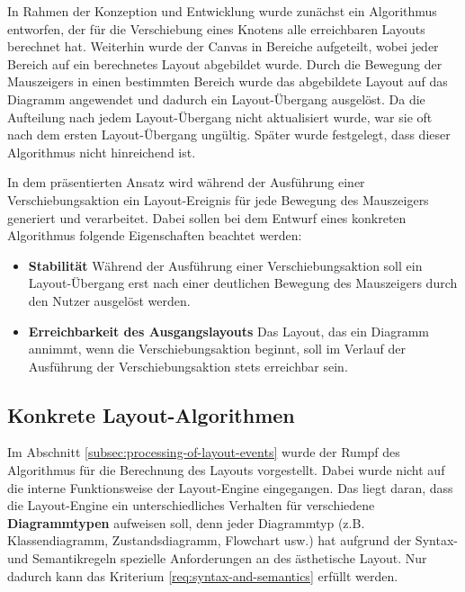 In Rahmen der Konzeption und Entwicklung wurde zunächst ein Algorithmus entworfen, der für die Verschiebung eines Knotens alle erreichbaren Layouts berechnet hat. Weiterhin wurde der Canvas in Bereiche aufgeteilt, wobei jeder Bereich auf ein berechnetes Layout abgebildet wurde. Durch die Bewegung der Mauszeigers in einen bestimmten Bereich wurde das abgebildete Layout auf das Diagramm angewendet und dadurch ein Layout-Übergang ausgelöst. Da die Aufteilung nach jedem Layout-Übergang nicht aktualisiert wurde, war sie oft nach dem ersten Layout-Übergang ungültig. Später wurde festgelegt, dass dieser Algorithmus nicht hinreichend ist.

In dem präsentierten Ansatz wird während der Ausführung einer Verschiebungsaktion ein Layout-Ereignis für jede Bewegung des Mauszeigers generiert und verarbeitet. Dabei sollen bei dem Entwurf eines konkreten Algorithmus folgende Eigenschaften beachtet werden:

\begin{itemize}

\item
\textbf{Stabilität}
Während der Ausführung einer Verschiebungsaktion soll ein Layout-Übergang erst nach einer deutlichen Bewegung des Mauszeigers durch den Nutzer ausgelöst werden.

\item
\textbf{Erreichbarkeit des Ausgangslayouts}
Das Layout, das ein Diagramm annimmt, wenn die Verschiebungsaktion beginnt, soll im Verlauf der Ausführung der Verschiebungsaktion stets erreichbar sein.

\end{itemize}

\subsection{Konkrete Layout-Algorithmen}
\label{subsec:concrete-layout-algorithms}

Im Abschnitt \ref{subsec:processing-of-layout-events} wurde der Rumpf des Algorithmus für die Berechnung des Layouts vorgestellt. Dabei wurde nicht auf die interne Funktionsweise der Layout-Engine eingegangen. Das liegt daran, dass die Layout-Engine ein unterschiedliches Verhalten für verschiedene \textbf{Diagrammtypen} aufweisen soll, denn jeder Diagrammtyp (z.B. Klassendiagramm, Zustandsdiagramm, Flowchart usw.) hat aufgrund der Syntax- und Semantikregeln spezielle Anforderungen an des ästhetische Layout. Nur dadurch kann das Kriterium \ref{req:syntax-and-semantics} erfüllt werden.

